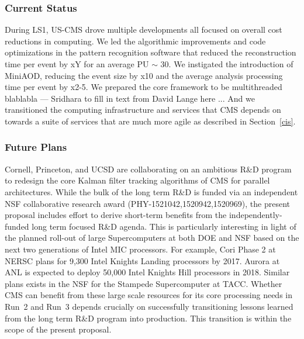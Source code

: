 \documentclass[11pt,a4paper]{article}
\begin{document}
\subsubsection{Current Status}

During LS1, US-CMS drove multiple developments all focused on overall cost reductions in computing.
We led the algorithmic improvements and code optimizations in the pattern recognition software that reduced the reconstruction
time per event by xY for an average PU $\sim$ 30. We instigated the introduction of MiniAOD, reducing the event size by x10
and the average analysis processing time per event by x2-5.
We prepared the core framework to be multithreaded blablabla --- Sridhara to fill in text from David Lange here ... 
And we transitioned the computing infrastructure and services that CMS depends on towards a suite of services that are much 
more agile as described in Section~\ref{cis}.

\subsubsection{Future Plans}

 Cornell, Princeton, and UCSD are
collaborating on an ambitious R\&D program to redesign the core
Kalman filter tracking algorithms of CMS for parallel architectures.  While
the bulk of the long term R\&D is funded via an
independent NSF collaborative research award (PHY-1521042,1520942,1520969), the present proposal includes 
effort to derive short-term benefits from the
independently-funded long term focused R\&D agenda.  This is particularly
interesting in light of the planned roll-out of large Supercomputers at
both DOE and NSF based on the next two generations of Intel MIC
processors. For example, Cori Phase 2 at NERSC plans for 9,300 Intel
Knights Landing processors by 2017. Aurora at ANL is expected to deploy
50,000 Intel Knights Hill processors in 2018.  Similar plans exists in the
NSF for the Stampede Supercomputer at TACC.  Whether CMS can
benefit from these large scale resources for its core processing needs in
Run~2 and Run~3 depends crucially on successfully transitioning lessons
learned from the long term R\&D program into
production. This transition is within the scope of the present proposal.
\end{document}
